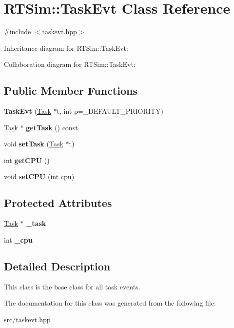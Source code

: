 \hypertarget{classRTSim_1_1TaskEvt}{}\section{R\+T\+Sim\+:\+:Task\+Evt Class Reference}
\label{classRTSim_1_1TaskEvt}


{\ttfamily \#include $<$taskevt.\+hpp$>$}



Inheritance diagram for R\+T\+Sim\+:\+:Task\+Evt\+:


Collaboration diagram for R\+T\+Sim\+:\+:Task\+Evt\+:
\subsection*{Public Member Functions}
\begin{DoxyCompactItemize}
\item 
{\bfseries Task\+Evt} (\hyperlink{classRTSim_1_1Task}{Task} $\ast$t, int p=\+\_\+\+D\+E\+F\+A\+U\+L\+T\+\_\+\+P\+R\+I\+O\+R\+I\+TY)
\item 
\hyperlink{classRTSim_1_1Task}{Task} $\ast$ {\bfseries get\+Task} () const 
\item 
void {\bfseries set\+Task} (\hyperlink{classRTSim_1_1Task}{Task} $\ast$t)
\item 
int {\bfseries get\+C\+PU} ()
\item 
void {\bfseries set\+C\+PU} (int cpu)
\end{DoxyCompactItemize}
\subsection*{Protected Attributes}
\begin{DoxyCompactItemize}
\item 
\hyperlink{classRTSim_1_1Task}{Task} $\ast$ {\bfseries \+\_\+task}
\item 
int {\bfseries \+\_\+cpu}
\end{DoxyCompactItemize}


\subsection{Detailed Description}
This class is the base class for all task events. 

The documentation for this class was generated from the following file\+:\begin{DoxyCompactItemize}
\item 
src/taskevt.\+hpp\end{DoxyCompactItemize}
